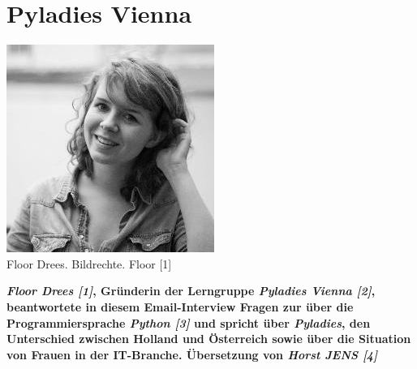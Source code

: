 \section*{Pyladies Vienna}
\hypertarget{floor}{}
\label{floor}
\begin{center}
\includegraphics[width=\linewidth]{floor/floor.jpg} \\
\footnotesize{Floor Drees. Bildrechte. Floor [1]}
\end{center}
\textbf{\textit{Floor Drees [1]}, Gründerin der Lerngruppe \textit{Pyladies Vienna [2]}, beantwortete in diesem Email-Interview Fragen zur über die Programmiersprache \textit{Python [3]} und spricht über \textit{Pyladies},  den Unterschied zwischen Holland und Österreich sowie über die Situation von Frauen in der IT-Branche. Übersetzung von \textit{Horst JENS [4]}} \\
